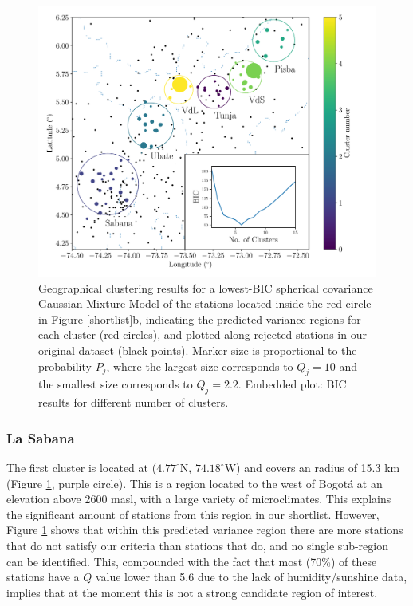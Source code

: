 \documentclass[a4paper,fleqn,usenatbib]{mnras}
\begin{document}
\begin{figure}
\begin{center}
\includegraphics[scale=0.7,trim={0 0 50 0},clip]{unif.pdf}
\caption{Geographical clustering results  for a lowest-BIC spherical covariance Gaussian Mixture Model of the stations located inside the red circle in Figure \ref{shortlist}b, indicating the predicted variance regions for each cluster (red circles), and plotted along rejected stations in our original dataset (black points). Marker size is proportional to the probability $P_j$, where the largest size corresponds to  $Q_j=10$ and the smallest size corresponds to $Q_j=2.2$. Embedded plot: BIC results for different number of clusters. }\label{unif}
\end{center}
\end{figure}

\subsubsection{La Sabana}

The first cluster is located at ($4.77^\circ$N, $74.18^\circ$W) and covers an radius of 15.3 km (Figure \ref{unif}, purple circle). This is a region located to the west of Bogot\'a at an elevation above 2600 masl, with a large variety of microclimates. This explains the significant amount of stations from this region in our shortlist. However, Figure \ref{unif} shows that within this predicted variance region there are more stations that do not satisfy our criteria than stations that do, and no single sub-region can be identified. This, compounded with the fact that most (70\%) of these stations have a $Q$ value lower than 5.6 due to the lack of humidity/sunshine data, implies that at the moment this is not a strong candidate region of interest.
\end{document}
